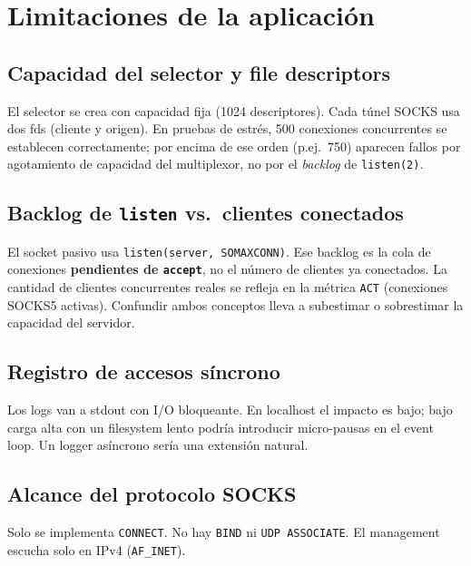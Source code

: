 \documentclass[12pt,a4paper]{article}
\begin{document}
\section{Limitaciones de la aplicación}

\subsection{Capacidad del selector y file descriptors}

El selector se crea con capacidad fija (1024 descriptores). Cada túnel SOCKS usa
dos fds (cliente y origen). En pruebas de estrés, 500 conexiones concurrentes se
establecen correctamente; por encima de ese orden (p.ej.\ 750) aparecen fallos por
agotamiento de capacidad del multiplexor, no por el \textit{backlog} de
\texttt{listen(2)}.

\subsection{Backlog de \texttt{listen} vs.\ clientes conectados}

El socket pasivo usa \texttt{listen(server, SOMAXCONN)}. Ese backlog es la cola de
conexiones \textbf{pendientes de \texttt{accept}}, no el número de clientes ya
conectados. La cantidad de clientes concurrentes reales se refleja en la métrica
\texttt{ACT} (conexiones SOCKS5 activas). Confundir ambos conceptos lleva a
subestimar o sobrestimar la capacidad del servidor.

\subsection{Registro de accesos síncrono}

Los logs van a stdout con I/O bloqueante. En localhost el impacto es bajo; bajo
carga alta con un filesystem lento podría introducir micro-pausas en el event loop.
Un logger asíncrono sería una extensión natural.

\subsection{Alcance del protocolo SOCKS}

Solo se implementa \texttt{CONNECT}. No hay \texttt{BIND} ni \texttt{UDP ASSOCIATE}.
El management escucha solo en IPv4 (\texttt{AF\_INET}).

\end{document}
